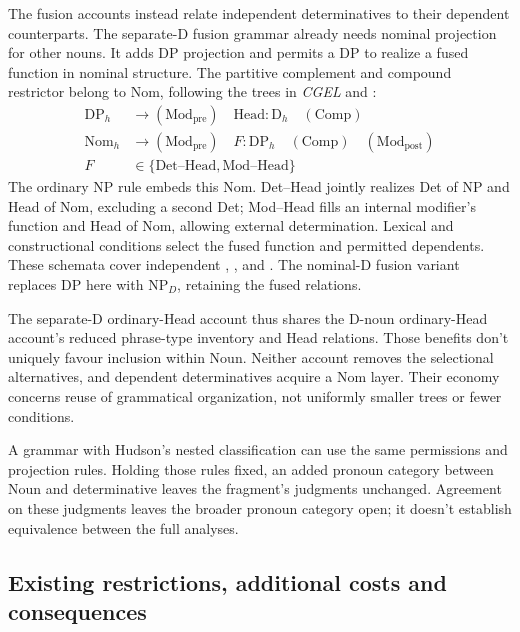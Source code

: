 \documentclass[12pt]{article}
\begin{document}
The fusion accounts instead relate independent determinatives to their dependent counterparts. The separate-D fusion grammar already needs nominal projection for other nouns. It adds DP projection and permits a DP to realize a fused function in nominal structure. The partitive complement and compound restrictor belong to Nom, following the trees in \textit{CGEL} and \textcite[582]{Payne2007}:
\[
\begin{aligned}
\mathrm{DP}_{h} &\to (\mathrm{Mod}_{\mathrm{pre}})\quad \mathrm{Head}:\mathrm{D}_{h}\quad (\mathrm{Comp}) \\
\mathrm{Nom}_{h} &\to (\mathrm{Mod}_{\mathrm{pre}})\quad F:\mathrm{DP}_{h}\quad (\mathrm{Comp})\quad (\mathrm{Mod}_{\mathrm{post}}) \\
F&\in\{\mathrm{Det\text{--}Head},\mathrm{Mod\text{--}Head}\}
\end{aligned}
\]
The ordinary NP rule embeds this Nom. Det--Head jointly realizes Det of NP and Head of Nom, excluding a second Det; Mod--Head fills an internal modifier's function and Head of Nom, allowing external determination. Lexical and constructional conditions select the fused function and permitted dependents. These schemata cover independent , ,  and . The nominal-D fusion variant replaces DP here with $\mathrm{NP}_{D}$, retaining the fused relations.

The separate-D ordinary-Head account thus shares the D-noun ordinary-Head account's reduced phrase-type inventory and Head relations. Those benefits don't uniquely favour inclusion within Noun. Neither account removes the selectional alternatives, and dependent determinatives acquire a Nom layer. Their economy concerns reuse of grammatical organization, not uniformly smaller trees or fewer conditions.

A grammar with Hudson's nested classification can use the same permissions and projection rules. Holding those rules fixed, an added pronoun category between Noun and determinative leaves the fragment's judgments unchanged. Agreement on these judgments leaves the broader pronoun category open; it doesn't establish equivalence between the full analyses.

\subsection{Existing restrictions, additional costs and consequences}\label{sec:costs}
\end{document}
